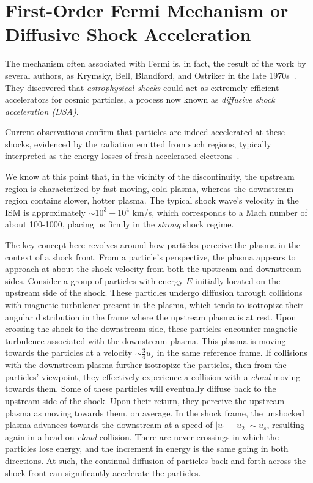 \section{First-Order Fermi Mechanism or Diffusive Shock Acceleration}

The mechanism often associated with Fermi is, in fact, the result of the work by several authors, as Krymsky, Bell, Blandford, and Ostriker in the late 1970s~\cite{addref}. 
%
%
They discovered that \emph{astrophysical shocks} could act as extremely efficient accelerators for cosmic particles, a process now known as \emph{diffusive shock acceleration (DSA)}.

Current observations confirm that particles are indeed accelerated at these shocks, evidenced by the radiation emitted from such regions, typically interpreted as the energy losses of fresh accelerated electrons~\cite{ref}. 

We know at this point that, in the vicinity of the discontinuity, the upstream region is characterized by fast-moving, cold plasma, whereas the downstream region contains slower, hotter plasma. 
%
The typical shock wave's velocity in the ISM is approximately \( \sim 10^3-10^4 \) km/s, which corresponds to a Mach number of about 100-1000, placing us firmly in the \emph{strong} shock regime.

The key concept here revolves around how particles perceive the plasma in the context of a shock front. From a particle's perspective, the plasma appears to approach at about the shock velocity from both the upstream and downstream sides. 
%
Consider a group of particles with energy \( E \) initially located on the upstream side of the shock. These particles undergo diffusion through collisions with magnetic turbulence present in the plasma, which tends to isotropize their angular distribution in the frame where the upstream plasma is at rest.
%
Upon crossing the shock to the downstream side, these particles encounter magnetic turbulence associated with the downstream plasma. This plasma is moving towards the particles at a velocity \( \sim \frac{3}{4} u_s \) in the same reference frame. If collisions with the downstream plasma further isotropize the particles, then from the particles' viewpoint, they effectively experience a collision with a \emph{cloud} moving towards them. 
%
Some of these particles will eventually diffuse back to the upstream side of the shock. Upon their return, they perceive the upstream plasma as moving towards them, on average. In the shock frame, the unshocked plasma advances towards the downstream at a speed of \( |u_1 - u_2| \sim u_s \), resulting again in a head-on \emph{cloud} collision.
%
There are never crossings in which the particles lose energy, and the increment in energy is the same going in both directions. At such, the continual diffusion of particles back and forth across the shock front can significantly accelerate the particles. 

